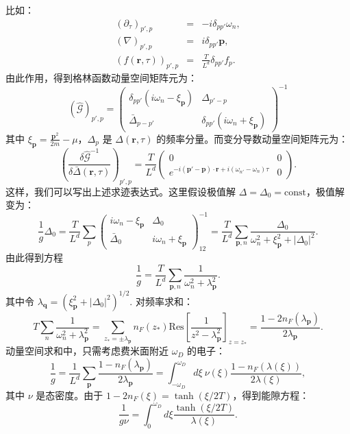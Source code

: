 \documentclass[10pt,UTF8]{ctexart}
\begin{document}
比如：
\begin{eqnarray}
	(\partial_\tau)_{p',p} &=& -i \delta_{pp'} \omega_n, \\
	(\nabla)_{p',p} &=& i \delta_{pp'} \bm p, \\
	\left(f(\bm r,\tau)\right)_{p',p} &=& \frac{T}{L^d}\delta_{pp'} f_p.
\end{eqnarray}
由此作用，得到格林函数动量空间矩阵元为：
\begin{equation}
	(\hat{\mathcal G})_{p',p}
	=
	\left( 
	\begin{array}{cc}
		\delta_{pp'}(i\omega_n - \xi_{\bm p})  & \Delta_{p'-p} \\
		\bar\Delta_{p-p'} & \delta_{pp'}(i\omega_n + \xi_{\bm p}) 
	\end{array}
	\right)^{-1}
\end{equation}
其中 $\xi_{\bm p} = \frac{\bm p^2}{2m} -\mu$，$\Delta_p$ 是 $\Delta(\bm r,\tau)$ 的频率分量。而变分导数动量空间矩阵元为：
\begin{equation}
	\left(\frac{\delta \hat{\mathcal G}^{-1}}{\delta \bar\Delta(\bm r,\tau)} \right)_{p',p}
	= \frac{T}{L^d}
	\left( 
	\begin{array}{cc}
		0  & 0 \\
		e^{-i(\bm p'-\bm p)\cdot \bm r+i(\omega_{n'}-\omega_n) \tau} & 0 
	\end{array}
	\right).
\end{equation}
这样，我们可以写出上述求迹表达式。这里假设极值解 $\Delta=\Delta_0=\mathrm{const}$，极值解变为：
\begin{equation}
	\frac{1}{g} \Delta_0 = \frac{T}{L^d}\sum_{p} 
	\left( 
	\begin{array}{cc}
		i\omega_n - \xi_{\bm p}  & \Delta_0 \\
		\bar\Delta_0 & i\omega_n + \xi_{\bm p} 
	\end{array}
	\right)^{-1}_{12} 
	= \frac{T}{L^d} \sum_{\bm p,n} \frac{\Delta_0}{\omega_n^2+\xi_{\bm p}^2 +|\Delta_0|^2}.
\end{equation}
由此得到方程
\begin{equation}
	\frac{1}{g} = \frac{T}{L^d} \sum_{\bm p,n} \frac{1}{\omega_n^2+\lambda_{\bm p}^2}.
\end{equation}
其中令 $\lambda_{\bm q} = (\xi_{\bm p}^2+|\Delta_0|^2)^{1/2}$. 对频率求和：
\begin{equation}
	T\sum_n \frac{1}{\omega_n^2+\lambda_{\bm p}^2} 
	= \sum_{z_*=\pm \lambda_{\bm p}}
	n_F(z_*) \mathrm{Res}\left[\frac{1}{z^2-\lambda_{\bm p}^2} \right]_{z=z_*}
	=\frac{1-2n_F(\lambda_{\bm p})}{2\lambda_{\bm p}}.
\end{equation}
动量空间求和中，只需考虑费米面附近 $\omega_D$ 的电子：
\begin{equation}
	\frac{1}{g}
	=\frac{1}{L^d}\sum_{\bm p}\frac{1-n_F(\lambda_{\bm p})}{2\lambda_{\bm p}}
	=\int_{-\omega_D}^{\omega_D}d\xi \ \nu(\xi) \frac{1-n_F(\lambda(\xi))}{2\lambda(\xi)},
\end{equation}
其中 $\nu$ 是态密度。由于 $1-2n_F(\xi) = \tanh(\xi/2T)$，得到能隙方程：
\begin{equation}
	\frac{1}{g\nu} = \int_0^{\omega_D}d\xi \frac{\tanh(\xi/2T)}{\lambda(\xi)}.
\end{equation}
\end{document}
